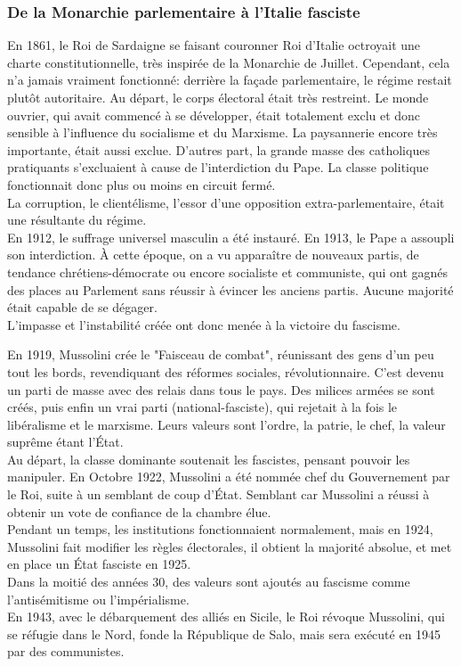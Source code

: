 \documentclass[10pt, a4paper, openany]{book}
\begin{document}
\subsubsection{De la Monarchie parlementaire à l'Italie fasciste}

En 1861, le Roi de Sardaigne se faisant couronner Roi d'Italie octroyait une charte constitutionnelle, très inspirée de la Monarchie de Juillet. Cependant, cela n'a jamais vraiment fonctionné: derrière la façade parlementaire, le régime restait plutôt autoritaire. Au départ, le corps électoral était très restreint. Le monde ouvrier, qui avait commencé à se développer, était totalement exclu et donc sensible à l'influence du socialisme et du Marxisme. La paysannerie encore très importante, était aussi exclue. D'autres part, la grande masse des catholiques pratiquants s'excluaient à cause de l'interdiction du Pape. La classe politique fonctionnait donc plus ou moins en circuit fermé. \\
La corruption, le clientélisme, l'essor d'une opposition extra-parlementaire, était une résultante du régime. \\
En 1912, le suffrage universel masculin a été instauré. En 1913, le Pape a assoupli son interdiction. À cette époque, on a vu apparaître de nouveaux partis, de tendance chrétiens-démocrate ou encore socialiste et communiste, qui ont gagnés des places au Parlement sans réussir à évincer les anciens partis. Aucune majorité était capable de se dégager. \\
L'impasse et l'instabilité créée ont donc menée à la victoire du fascisme. 


En 1919, Mussolini crée le "Faisceau de combat", réunissant des gens d'un peu tout les bords, revendiquant des réformes sociales, révolutionnaire. C'est devenu un parti de masse avec des relais dans tous le pays. Des milices armées se sont créés, puis enfin un vrai parti (national-fasciste), qui rejetait à la fois le libéralisme et le marxisme. Leurs valeurs sont l'ordre, la patrie, le chef, la valeur suprême étant l'État. \\
Au départ, la classe dominante soutenait les fascistes, pensant pouvoir les manipuler. En Octobre 1922, Mussolini a été nommée chef du Gouvernement par le Roi, suite à un semblant de coup d'État. Semblant car Mussolini a réussi à obtenir un vote de confiance de la chambre élue. \\
Pendant un temps, les institutions fonctionnaient normalement, mais en 1924, Mussolini fait modifier les règles électorales, il obtient la majorité absolue, et met en place un État fasciste en 1925. \\
Dans la moitié des années 30, des valeurs sont ajoutés au fascisme comme l'antisémitisme ou l'impérialisme. \\
En 1943, avec le débarquement des alliés en Sicile, le Roi révoque Mussolini, qui se réfugie dans le Nord, fonde la République de Salo, mais sera exécuté en 1945 par des communistes. 
\end{document}
